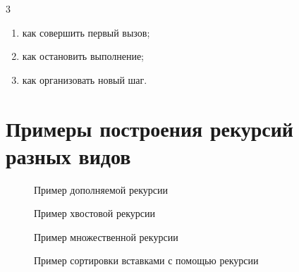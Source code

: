 \begin{listbox}{\noindent \begin{listboxtitle}{}3\end{listboxtitle} 
    \raisebox{6pt}{Проблемы рекурсии:}}
\begin{enumerate}
	\item как совершить первый вызов;
	\item как остановить выполнение;
	\item как организовать новый шаг.
\end{enumerate}
\end{listbox}

\section{Примеры построения рекурсий разных видов}

\begin{figure}[H]
    \begin{listingbox}{}
        
    \end{listingbox}
    \caption{Пример дополняемой рекурсии}
    \label{lst:recursion-add-example}
\end{figure}

\begin{figure}[H]
    \begin{listingbox}{}
        
    \end{listingbox}
    \caption{Пример хвостовой рекурсии}
    \label{lst:recursion-tail-example}
\end{figure}

\begin{figure}[H]
    \begin{listingbox}{}
        
    \end{listingbox}
    \caption{Пример множественной рекурсии}
    \label{lst:recursion-many-example}
\end{figure}

\begin{figure}[H]
    \begin{listingbox}{}
        
    \end{listingbox}
    \caption{Пример сортировки вставками с помощью рекурсии}
    \label{lst:recursion-sort-example}
\end{figure}